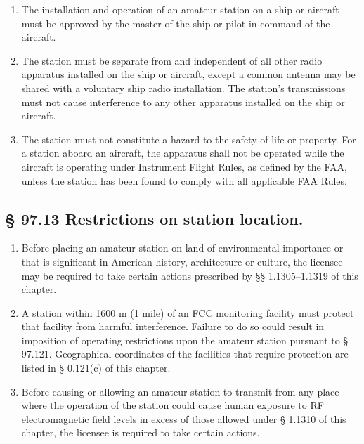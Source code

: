\documentclass[
  letterpaper,
  DIV=11,
  numbers=noendperiod]{scrreport}
\begin{document}
\begin{enumerate}
\def\labelenumi{(\alph{enumi})}
\item
  The installation and operation of an amateur station on a ship or
  aircraft must be approved by the master of the ship or pilot in
  command of the aircraft.
\item
  The station must be separate from and independent of all other radio
  apparatus installed on the ship or aircraft, except a common antenna
  may be shared with a voluntary ship radio installation. The station's
  transmissions must not cause interference to any other apparatus
  installed on the ship or aircraft.
\item
  The station must not constitute a hazard to the safety of life or
  property. For a station aboard an aircraft, the apparatus shall not be
  operated while the aircraft is operating under Instrument Flight
  Rules, as defined by the FAA, unless the station has been found to
  comply with all applicable FAA Rules.
\end{enumerate}

\hypertarget{restrictions-on-station-location.}{%
\subsection*{§ 97.13 Restrictions on station
location.}\label{restrictions-on-station-location.}}

\begin{enumerate}
\def\labelenumi{(\alph{enumi})}
\item
  Before placing an amateur station on land of environmental importance
  or that is significant in American history, architecture or culture,
  the licensee may be required to take certain actions prescribed by §§
  1.1305--1.1319 of this chapter.
\item
  A station within 1600 m (1 mile) of an FCC monitoring facility must
  protect that facility from harmful interference. Failure to do so
  could result in imposition of operating restrictions upon the amateur
  station pursuant to § 97.121. Geographical coordinates of the
  facilities that require protection are listed in § 0.121(c) of this
  chapter.
\item
  Before causing or allowing an amateur station to transmit from any
  place where the operation of the station could cause human exposure to
  RF electromagnetic field levels in excess of those allowed under §
  1.1310 of this chapter, the licensee is required to take certain
  actions.
\end{enumerate}
\end{document}
